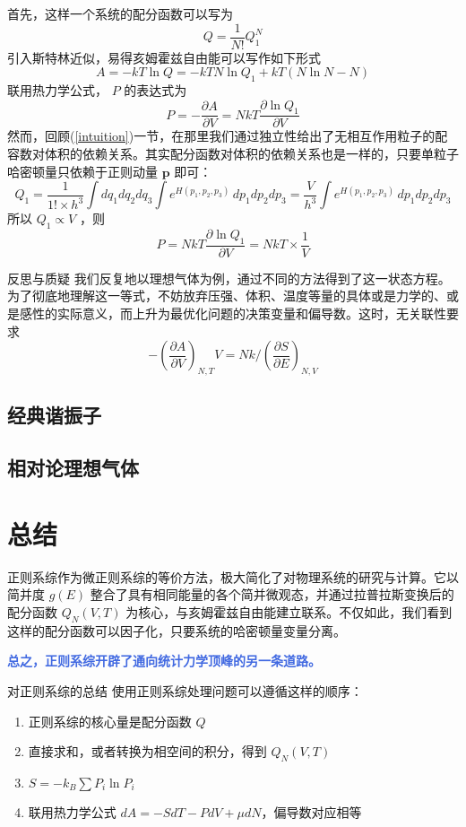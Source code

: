 \documentclass[hyperref,UTF-8]{ctexbook}
\newcommand{\0}{\boldsymbol{0}}
\begin{document}
首先，这样一个系统的配分函数可以写为
\[
    Q = \frac{1}{N!} Q_1^N
\]
引入斯特林近似，易得亥姆霍兹自由能可以写作如下形式
\[
    A = -kT\ln Q = -kT N \ln Q_1 + kT(N\ln N - N)
\]
联用热力学公式， $P$ 的表达式为
\[
    P = - \frac{\partial A}{\partial V} = NkT \frac{\partial \ln Q_1}{\partial V}
\]
然而，回顾(\ref*{intuition})一节，在那里我们通过独立性给出了无相互作用粒子的配容数对体积的依赖关系。其实配分函数对体积的依赖关系也是一样的，只要单粒子哈密顿量只依赖于正则动量 $\bm{p}$ 即可：
\[
    Q_1 = \frac{1}{1!\times h^3}\int dq_1dq_2dq_3\int e^{H(p_1,p_2,p_3)}\,dp_1dp_2dp_3  = \frac{V}{h^3} \int e^{H(p_1,p_2,p_3)}\,dp_1dp_2dp_3
\]
所以 $Q_1 \propto V$ ，则
\[
    P = NkT \frac{\partial \ln Q_1}{\partial V} = NkT \times \frac{1}{V} 
\]
\begin{justification}{\kaishu 反思与质疑}
\kaishu \fontsize{11pt}{16pt}
    \quad\quad 我们反复地以理想气体为例，通过不同的方法得到了这一状态方程。为了彻底地理解这一等式，不妨放弃压强、体积、温度等量的具体或是力学的、或是感性的实际意义，而上升为最优化问题的决策变量和偏导数。这时，无关联性要求
    \[
        -\left(\frac{\partial A}{\partial V}\right)_{N,T} V = Nk \bigg/ \left(\frac{\partial S}{\partial E} \right)_{N,V}
    \]
\end{justification}

\subsection{经典谐振子}

\subsection{相对论理想气体}

\section{总结}\label{sec:正则系综总结}

正则系综作为微正则系综的等价方法，极大简化了对物理系统的研究与计算。它以简并度 $g(E)$ 整合了具有相同能量的各个简并微观态，并通过拉普拉斯变换后的配分函数 $Q_N(V,T)$ 为核心，与亥姆霍兹自由能建立联系。不仅如此，我们看到这样的配分函数可以因子化，只要系统的哈密顿量变量分离。

\textcolor{RoyalBlue}{\textbf{\kaishu 总之，正则系综开辟了通向统计力学顶峰的另一条道路。}}

\begin{understanding}{\kaishu 对正则系综的总结}
\kaishu \fontsize{11pt}{16pt}
使用正则系综处理问题可以遵循这样的顺序：
\begin{enumerate}
    \item 正则系综的核心量是配分函数 $Q$
    \item 直接求和，或者转换为相空间的积分，得到 $Q_N(V,T)$
    \item $S = -k_B \sum P_i \ln P_i$
    \item 联用热力学公式 $dA = -SdT - PdV + \mu dN$，偏导数对应相等
\end{enumerate}

\end{understanding}
\end{document}
